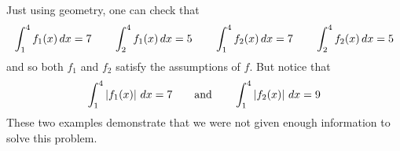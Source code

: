 \documentclass[nooutcomes]{ximera}
\begin{document}
\begin{problem}
\begin{enumerate}
\begin{freeResponse}
	Just using geometry, one can check that
	$$ \int_1^4 f_1(x)\,d x = 7	\qquad	\int_2^4 f_1(x)\,d x = 5	\qquad	\int_1^4 f_2(x)\,d x = 7	\qquad	\int_2^4 f_2(x)\,d x = 5 $$
	and so both $f_1$ and $f_2$ satisfy the assumptions of $f$.  But notice that
	$$\int_1^4 \left| f_1(x) \right| \,d x = 7	\qquad	\text{and}		\qquad	\int_1^4 \left| f_2(x) \right| \,d x = 9  $$
	These two examples demonstrate that we were not given enough information to solve this problem.
		
		\end{freeResponse}
		
		
		
	\end{enumerate}
		
			
			
		
\end{problem}


















	
	
	
	
	
	
	
	
	

	










								
				
				
	
\end{document}
